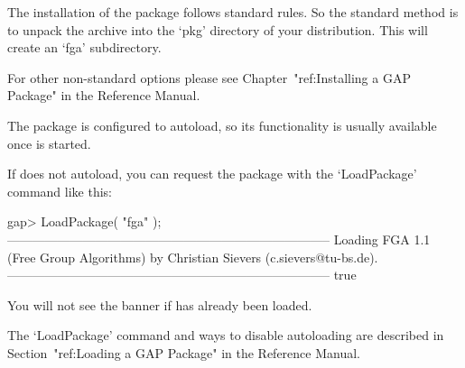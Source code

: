 

\null

The installation of the {\FGA} package follows standard {\GAP} rules.
So the standard method is to unpack the archive into the `pkg'
directory  of your {\GAP} distribution.  This will create an `fga'
subdirectory. 

For other non-standard options please see Chapter~"ref:Installing a
GAP Package" in the {\GAP} Reference Manual.


\null

The {\FGA} package is configured to autoload, so its functionality is
usually available once {\GAP} is started.

If {\GAP} does not autoload, you can request the package with the
`LoadPackage' command like this:

\beginexample
gap> LoadPackage( "fga" );
-----------------------------------------------------------------------------
Loading  FGA 1.1 (Free Group Algorithms)
by Christian Sievers (c.sievers@tu-bs.de).
-----------------------------------------------------------------------------
true
\endexample

You will not see the banner if {\FGA} has already been loaded.

The `LoadPackage' command and ways to disable autoloading are
described in Section~"ref:Loading a GAP Package" in the {\GAP}
Reference Manual.

